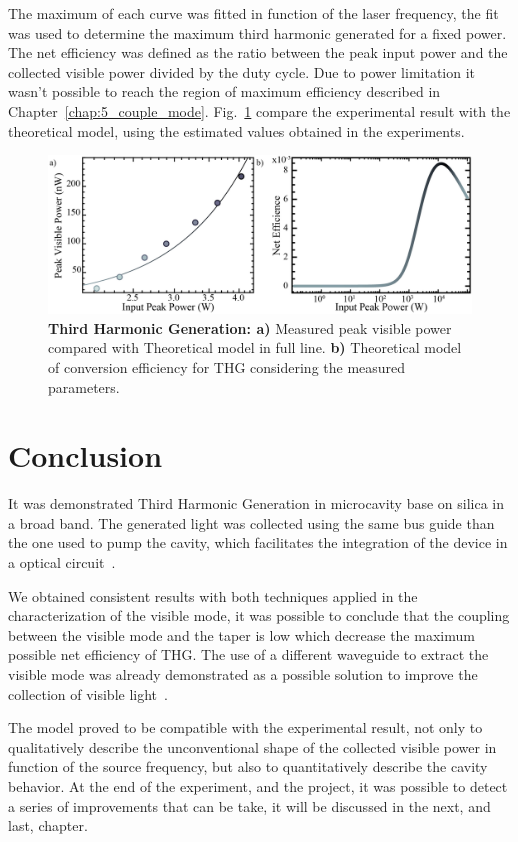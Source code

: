 The maximum of each curve was fitted in function of the laser frequency, the fit was used to determine the maximum third harmonic generated for a fixed power. The net efficiency was defined as the ratio between the peak input power and the collected visible power divided by the duty cycle. Due to power limitation it wasn't possible to reach the region of maximum efficiency described in Chapter~\ref{chap:5_couple_mode}. Fig.~\ref{fig:net_eff} compare the experimental result with the theoretical model, using the estimated values obtained in the experiments. 
\begin{figure}[h]
    \centering
    \includegraphics[width = 16cm]{figuras/Dissertation_net_eff.jpg}
    \caption{\textbf{Third Harmonic Generation: a)} Measured peak visible power compared with Theoretical model in full line. \textbf{b)} Theoretical model of conversion efficiency for THG considering the measured parameters.}
    \label{fig:net_eff}
\end{figure}

\section{Conclusion}

It was demonstrated Third Harmonic Generation in microcavity base on silica in a broad band. The generated light was collected using the same bus guide than the one used to pump the cavity, which facilitates the integration of the device in a optical circuit~\cite{Soares2016}.

We obtained consistent results with both techniques applied in the characterization of the visible mode, it was possible to conclude that the coupling between the visible mode and the taper is low which decrease the maximum possible net efficiency of THG. The use of a different waveguide to extract the visible mode was already demonstrated as a possible solution to improve the collection of visible light~\cite{Surya17}.

The model proved to be compatible with the experimental result, not only to qualitatively describe the unconventional shape of the collected visible power in function of the source frequency, but also to quantitatively describe the cavity behavior. At the end of the experiment, and the project, it was possible to detect a series of improvements that can be take, it will be discussed in the next, and last, chapter.

